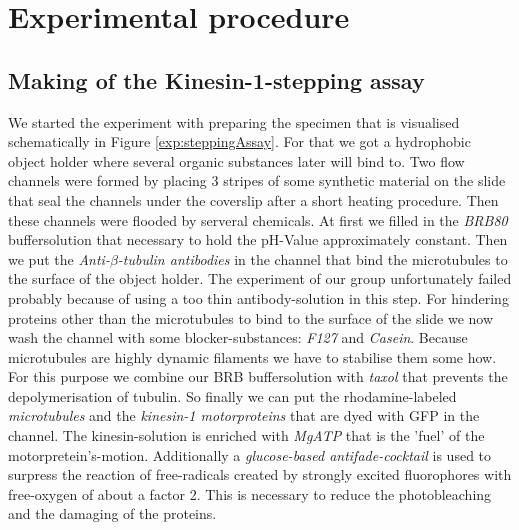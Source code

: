 \section{Experimental procedure}
	\subsection{Making of the Kinesin-1-stepping assay}
	
		
		We started the experiment with preparing the specimen that is visualised schematically in Figure \ref{exp:steppingAssay}. For that we got a hydrophobic object holder where several organic substances later will bind to. Two flow channels were formed by placing 3 stripes of some synthetic material on the slide that seal the channels under the coverslip after a short heating procedure. Then these channels were flooded by serveral chemicals. At first we filled in the \textit{BRB80} buffersolution that necessary to hold the pH-Value approximately constant. Then we put the \textit{Anti-$\beta$-tubulin antibodies} in the channel that bind the microtubules to the surface of the object holder. The experiment of our group unfortunately failed probably because of using a too thin antibody-solution in this step. For hindering proteins other than the microtubules to bind to the surface of the slide we now wash the channel with some blocker-substances: \textit{F127} and \textit{Casein}. Because microtubules are highly dynamic filaments we have to stabilise them some how. For this purpose we combine our BRB buffersolution with \textit{taxol} that prevents the depolymerisation of tubulin. So finally we can put the rhodamine-labeled \textit{microtubules} and the \textit{kinesin-1 motorproteins} that are dyed with GFP in the channel. The kinesin-solution is enriched with \textit{MgATP} that is the 'fuel' of the motorpretein's-motion. Additionally a \textit{glucose-based antifade-cocktail} is used to surpress the reaction of free-radicals created by strongly excited fluorophores with free-oxygen of about a factor 2. This is necessary to reduce the photobleaching and the damaging of the proteins.
